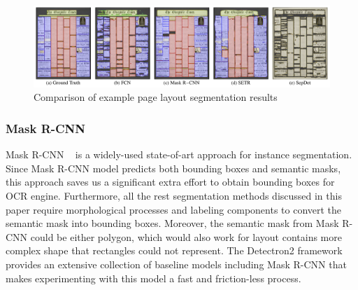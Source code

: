 \documentclass[letterpaper]{article} %
\begin{document}



\begin{figure}[h]
   \centering
   \includegraphics[width=\linewidth]{LaTeX/Figures/work-compressed.pdf}
   \caption{Comparison of example page layout segmentation results}
   \label{fig:all_vis}
 \end{figure}

\subsubsection{Mask R-CNN}
Mask R-CNN ~\cite{DBLP:conf/iccv/HeGDG17} is a widely-used state-of-art approach for instance segmentation. Since Mask R-CNN model predicts both bounding boxes and semantic masks, this approach saves us a significant extra effort to obtain bounding boxes for OCR engine. Furthermore, all the rest segmentation methods discussed in this paper require morphological processes and labeling components to convert the semantic mask into bounding boxes. Moreover, the semantic mask from Mask R-CNN could be either polygon, which would also work for layout contains more complex shape that rectangles could not represent.
The Detectron2 framework ~\cite{wu2019detectron2} provides an extensive collection of baseline models including Mask R-CNN that makes experimenting with this model a fast and friction-less process.
\end{document}
